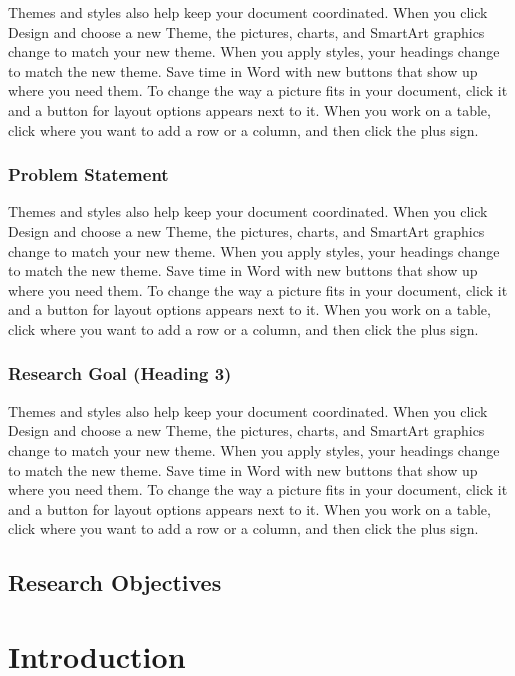 \documentclass[oneside]{utmthesis}
\begin{document}
Themes and styles also help keep your document coordinated. When you click 
Design and choose a new Theme, the pictures, charts, and SmartArt graphics change 
to match your new theme. When you apply styles, your headings change to match the 
new theme. Save time in Word with new buttons that show up where you need them. 
To change the way a picture fits in your document, click it and a button for layout 
options appears next to it. When you work on a table, click where you want to add a 
row or a column, and then click the plus sign.

\subsection{Problem Statement}

Themes and styles also help keep your document coordinated. When you click 
Design and choose a new Theme, the pictures, charts, and SmartArt graphics change 
to match your new theme. When you apply styles, your headings change to match the 
new theme. Save time in Word with new buttons that show up where you need them. 
To change the way a picture fits in your document, click it and a button for layout 
options appears next to it. When you work on a table, click where you want to add a 
row or a column, and then click the plus sign.

\subsection{Research Goal (Heading 3)}

Themes and styles also help keep your document coordinated. When you click 
Design and choose a new Theme, the pictures, charts, and SmartArt graphics change 
to match your new theme. When you apply styles, your headings change to match the 
new theme. Save time in Word with new buttons that show up where you need them. 
To change the way a picture fits in your document, click it and a button for layout 
options appears next to it. When you work on a table, click where you want to add a 
row or a column, and then click the plus sign.

\section{Research Objectives}

\chapter{Introduction}
\end{document}
